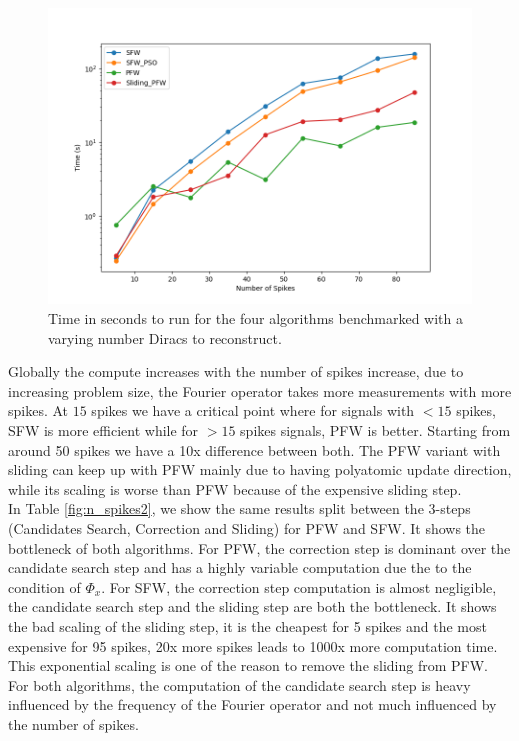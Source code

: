 \documentclass[a4paper,12pt,oneside]{report}
\theoremstyle{named}
\begin{document}
\begin{figure}[]
\centering
\includegraphics[width=1\linewidth]{n_spikes.png}
\caption{Time in seconds to run for the four algorithms benchmarked with a varying number Diracs to reconstruct.}
\label{fig:n_spikes}
\end{figure}

Globally the compute increases with the number of spikes increase, due to increasing problem size, the Fourier operator takes more measurements with more spikes. At $15$ spikes we have a critical point where for signals with $<15$ spikes, SFW is more efficient while for $>15$ spikes signals, PFW is better. Starting from around 50 spikes we have a 10x difference between both. The PFW variant with sliding can keep up with PFW mainly due to having polyatomic update direction, while its scaling is worse than PFW because of the expensive sliding step. \\

In Table \ref{fig:n_spikes2}, we show the same results split between the $3$-steps (Candidates Search, Correction and Sliding) for PFW and SFW. It shows the bottleneck of both algorithms. For PFW, the correction step is dominant over the candidate search step and has a highly variable computation due the to the condition of $\Phi_x$. For SFW, the correction step computation is almost negligible, the candidate search step and the sliding step are both the bottleneck. It shows the bad scaling of the sliding step, it is the cheapest for 5 spikes and the most expensive for 95 spikes, 20x more spikes leads to 1000x more computation time. This exponential scaling is one of the reason to remove the sliding from PFW. For both algorithms, the computation of the candidate search step is heavy influenced by the frequency of the Fourier operator and not much influenced by the number of spikes.
\end{document}

